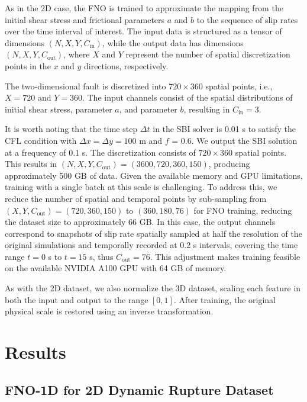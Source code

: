 \documentclass[draft]{agujournal2019}
\begin{document}
As in the 2D case, the FNO is trained to approximate the mapping from the initial shear stress and frictional parameters \( a \) and \( b \) to the sequence of slip rates over the time interval of interest. The input data is structured as a tensor of dimensions \( (N, X, Y, C_{\text{in}}) \), while the output data has dimensions \( (N, X, Y, C_{\text{out}}) \), where \( X \) and \( Y \) represent the number of spatial discretization points in the \( x \) and \( y \) directions, respectively.

The two-dimensional fault is discretized into \( 720 \times 360 \) spatial points, i.e., \( X = 720 \) and \( Y = 360 \). The input channels consist of the spatial distributions of initial shear stress, parameter \( a \), and parameter \( b \), resulting in \( C_{\text{in}} = 3 \).

It is worth noting that the time step $\Delta t$ in the SBI solver is 0.01 s to satisfy the CFL condition with \(\Delta x = \Delta y = 100\) m and \(f\) = 0.6. We output the SBI solution at a frequency of 0.1 s. The discretization consists of \( 720 \times 360 \) spatial points. This results in \( (N, X, Y, C_{\text{out}}) = (3600, 720, 360, 150) \), producing approximately 500 GB of data. Given the available memory and GPU limitations, training with a single batch at this scale is challenging. To address this, we reduce the number of spatial and temporal points by sub-sampling from \( (X, Y, C_{\text{out}}) = (720, 360, 150)\) to \((360, 180, 76)\) for FNO training, reducing the dataset size to approximately 66 GB. In this case, the output channels correspond to snapshots of slip rate spatially sampled at half the resolution of the original simulations and temporally recorded at 0.2 s intervals, covering the time range \( t = 0 \) s to \( t = 15 \) s, thus \( C_{\text{out}} = 76 \). This adjustment makes training feasible on the available NVIDIA A100 GPU with 64 GB of memory.

As with the 2D dataset, we also normalize the 3D dataset, scaling each feature in both the input and output to the range \([0,1]\). After training, the original physical scale is restored using an inverse transformation.


\section{Results}
\label{sec:results}

\subsection{FNO-1D for 2D Dynamic Rupture Dataset}
\label{sec:FNO-1D}
\end{document}

